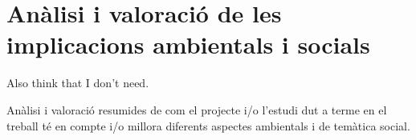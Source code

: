 \chapter{Anàlisi i valoració de les implicacions ambientals i socials}

Also think that I don't need.

Anàlisi i valoració resumides de com el projecte i/o l’estudi dut a terme en el treball té en compte i/o millora diferents aspectes ambientals i de temàtica social.
